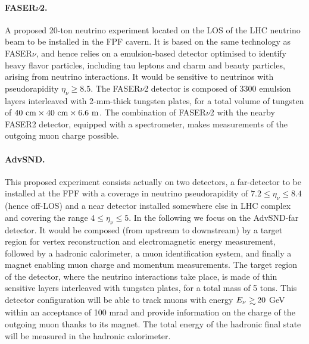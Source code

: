 \paragraph{FASER$\nu$2.}
%
A proposed 20-ton neutrino experiment located on the LOS
of the LHC neutrino beam to be installed in the FPF cavern.
%
It is based on the same technology as FASER$\nu$, and hence
relies on a emulsion-based detector optimised to identify heavy flavor particles, including
tau leptons and charm and beauty particles, arising from neutrino interactions.
%
It would be sensitive to neutrinos with pseudorapidity $\eta_\nu \ge 8.5$.
%
The FASER$\nu$2 detector is composed of 3300 emulsion layers interleaved with 2-mm-thick tungsten plates,
for a total volume of  tungsten of $40~\rm{cm} \times 40~\rm{cm} \times 6.6~{\rm m}$.
%
The combination of FASER$\nu$2  with the nearby FASER2 detector, equipped with a spectrometer, makes measurements of the outgoing muon charge possible.

 \paragraph{AdvSND.}
 This proposed experiment consists actually on  two detectors, a far-detector to be installed
 at the FPF with a coverage in neutrino pseudorapidity of $7.2 \le \eta_\nu \le 8.4$
 (hence off-LOS) and a near detector installed somewhere else in LHC
 complex and covering the range $4 \le \eta_\nu \le 5$.
 In the following we focus on the AdvSND-far detector.
 It would be
 composed (from upstream to downstream) by a target region
 for  vertex reconstruction and electromagnetic energy measurement, followed  by a hadronic calorimeter, a  muon identification system, and finally  a magnet enabling muon charge and momentum measurements.
 The target region of the detector, where the neutrino interactions take place, is made of thin sensitive layers interleaved with tungsten plates, for a total mass of 5 tons.
 This detector configuration will be able to track muons with energy $E_\nu \gsim 20$ GeV
 within an acceptance of 100 mrad and provide information on the charge
 of the  outgoing muon thanks to its magnet.
 The total energy of the hadronic final state will be measured
 in the hadronic calorimeter.

